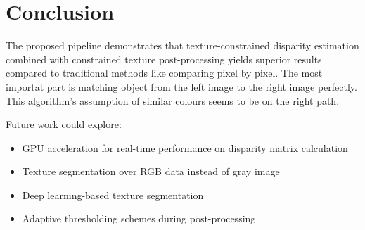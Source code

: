 \documentclass{article}
\begin{document}
\newpage
\section{Conclusion}
\vspace{1cm}
The proposed pipeline demonstrates that texture-constrained disparity estimation combined with constrained texture post-processing yields superior results compared to traditional methods
like comparing pixel by pixel. The most importat part is matching object from the left image to the right image perfectly. This algorithm's assumption of similar colours seems to be
on the right path.

Future work could explore:

\begin{itemize}
    \item GPU acceleration for real-time performance on disparity matrix calculation
    \item Texture segmentation over RGB data instead of gray image
    \item Deep learning-based texture segmentation
    \item Adaptive thresholding schemes during post-processing
\end{itemize}

\newpage
\end{document}
